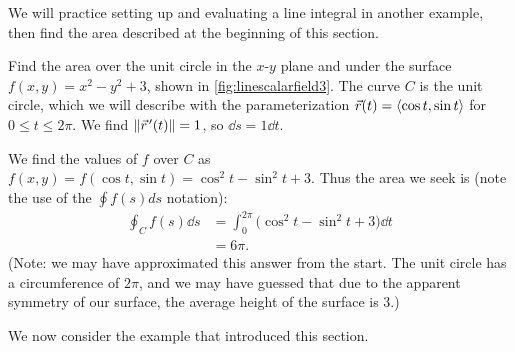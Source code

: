 We will practice setting up and evaluating a line integral in another example, then find the area described at the beginning of this section.

\begin{example}\label{ex_linescalarfield3}%
Find
%
%
the area over the unit circle in the $x$-$y$ plane and under the surface $f(x,y) = x^2-y^2+3$, shown in \autoref{fig:linescalarfield3}.
\solution
The curve $C$ is the unit circle, which we will describe with the parameterization $\vec r(t) =\left\langle \cos t,\sin t\right\rangle$ for $0\leq t\leq 2\pi$. We find $\left\lVert \vec r\hskip1.25pt '(t) \right\rVert = 1$, so $\dd s = 1 \dd t$.  

We find the values of $f$ over $C$ as $f(x,y) = f(\cos t, \sin t) = \cos^2t-\sin^2t+3$. Thus the area we seek is (note the use of the $\oint f(s) ds$ notation):
\begin{align*}
	\oint_C f(s)\dd s
	&= \int_0^{2\pi}\bigl(\cos^2t-\sin^2t+3\bigr)\dd t \\
	&= 6\pi.
\end{align*}
(Note: we may have approximated this answer from the start. The unit circle has a circumference of $2\pi$, and we may have guessed that due to the apparent symmetry of our surface, the average height of the surface is 3.)
\end{example}

We now consider the example that introduced this section.

